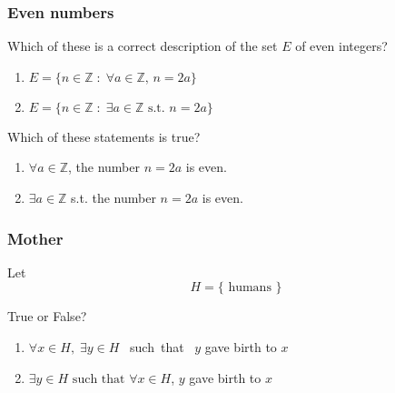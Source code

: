 \documentclass[14pt]{beamer}
\begin{document}

	\begin{frame}[t]
		\frametitle{Even numbers}

		Which of these is a correct description of the set $E$ of even integers?
		\begin{enumerate}
			\item $\displaystyle E = \{ n \in \mathbb{Z}\; : \; \forall a \in \mathbb{Z}
				, \, n = 2a \}$

			\item $\displaystyle E = \{ n \in \mathbb{Z}\; : \; \exists a \in \mathbb{Z}
				\text{ s.t. }n = 2a \}$
		\end{enumerate}

		\vfill

		Which of these statements is true?
		\begin{enumerate}
			\addtocounter{enumi}{2}

			\item $\displaystyle \forall a \in \mathbb{Z}$, the number
				$\displaystyle n=2a$ is even.

			\item $\displaystyle \exists a \in \mathbb{Z}$ s.t. the number
				$\displaystyle n=2a$ is even.
		\end{enumerate}

		\vfill
	\end{frame}


	\begin{frame}
		\frametitle{Mother}

		Let
		\[
			H = \{ \text{ humans }\}
		\]

		\vfill

		True or False?

		\begin{enumerate}
			\item $\displaystyle \forall x \in H, \; \exists y \in H$ \mbox{ such that
				} $y$ gave birth to $x$

			\item $\displaystyle \exists y \in H \text{ such that }\forall x \in H$,
				$y$ gave birth to $x$
		\end{enumerate}

		\vfill
	\end{frame}
\end{document}
